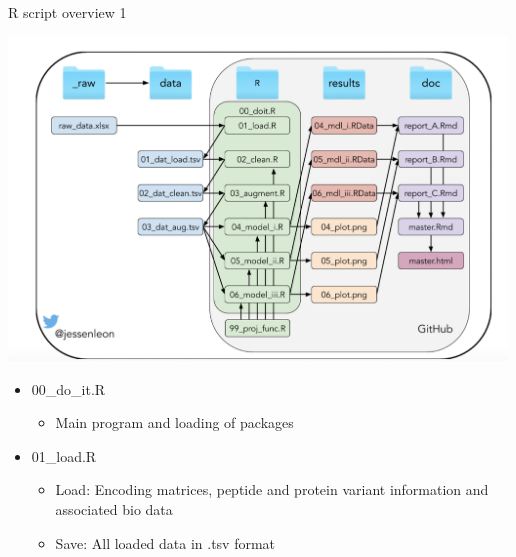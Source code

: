 \documentclass[ignorenonframetext,]{beamer}
\providecommand{\tightlist}{%
  \setlength{\itemsep}{0pt}\setlength{\parskip}{0pt}}
\begin{document}
\begin{frame}{R script overview 1}
\protect\hypertarget{r-script-overview-1}{}

\includegraphics[width=5.20833in,height=\textheight]{project_organisation.png}

\begin{itemize}
\tightlist
\item
  00\_do\_it.R

  \begin{itemize}
  \tightlist
  \item
    Main program and loading of packages
  \end{itemize}
\item
  01\_load.R

  \begin{itemize}
  \tightlist
  \item
    Load: Encoding matrices, peptide and protein variant information and
    associated bio data
  \item
    Save: All loaded data in .tsv format
  \end{itemize}
\end{itemize}

\end{frame}
\end{document}
